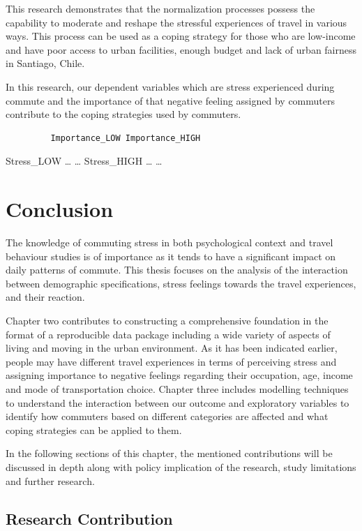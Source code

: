 \documentclass[
11pt, %
oneside, %
english, %
singlespacing, %
]{macthesis} %
\begin{document}
This research demonstrates that the normalization processes possess the capability to moderate and reshape the stressful experiences of travel in various ways. This process can be used as a coping strategy for those who are low-income and have poor access to urban facilities, enough budget and lack of urban fairness in Santiago, Chile.

In this research, our dependent variables which are stress experienced during commute and the importance of that negative feeling assigned by commuters contribute to the coping strategies used by commuters.
\begin{verbatim}
         Importance_LOW Importance_HIGH
\end{verbatim}
Stress\_LOW \ldots{} \ldots{}
Stress\_HIGH \ldots{} \ldots{}

\hypertarget{conclusion-1}{%
\chapter{Conclusion}\label{conclusion-1}}

The knowledge of commuting stress in both psychological context and travel behaviour studies is of importance as it tends to have a significant impact on daily patterns of commute. This thesis focuses on the analysis of the interaction between demographic specifications, stress feelings towards the travel experiences, and their reaction.

Chapter two contributes to constructing a comprehensive foundation in the format of a reproducible data package including a wide variety of aspects of living and moving in the urban environment. As it has been indicated earlier, people may have different travel experiences in terms of perceiving stress and assigning importance to negative feelings regarding their occupation, age, income and mode of transportation choice. Chapter three includes modelling techniques to understand the interaction between our outcome and exploratory variables to identify how commuters based on different categories are affected and what coping strategies can be applied to them.

In the following sections of this chapter, the mentioned contributions will be discussed in depth along with policy implication of the research, study limitations and further research.

\hypertarget{research-contribution}{%
\section{Research Contribution}\label{research-contribution}}
\end{document}
